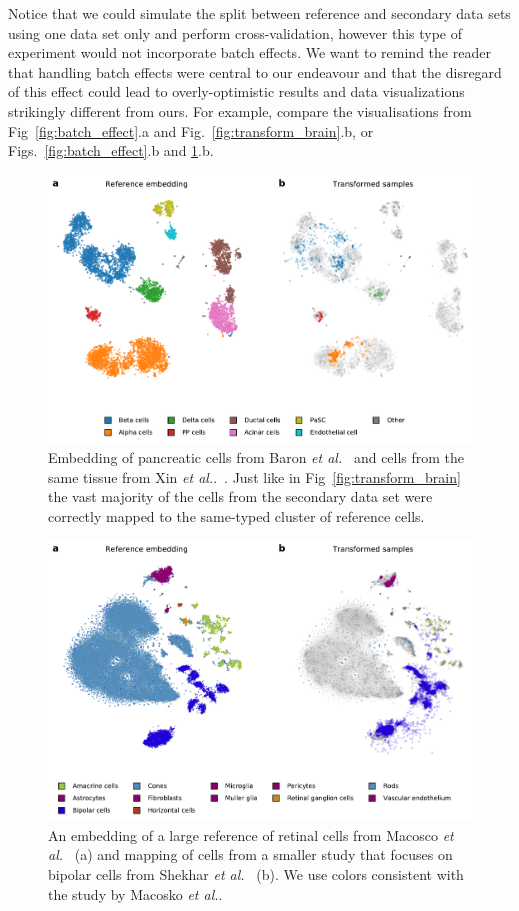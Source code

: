 \documentclass[runningheads]{llncs}
\newcommand{\etal}{\textit{et al.}}
\begin{document}
Notice that we could simulate the split between reference and secondary data
sets using one data set only and perform cross-validation, however this type of experiment
would not incorporate batch effects. We want to remind the reader that handling
batch effects were central to our endeavour and that the disregard of this effect
could lead to overly-optimistic results and data visualizations strikingly different from ours. For example,
compare the visualisations from Fig~\ref{fig:batch_effect}.a and
Fig.~\ref{fig:transform_brain}.b, or Figs.~\ref{fig:batch_effect}.b and
\ref{fig:transform_pancreas}.b.

\begin{figure}[htb]
\includegraphics[width=\textwidth]{figures/transform_pancreas.pdf}
\caption{Embedding of pancreatic cells from Baron \etal~\cite{baron2016} and
cells from the same tissue from Xin \etal.~\cite{xin2016}. Just like in
Fig~\ref{fig:transform_brain} the vast majority of the cells from the secondary
data set were correctly mapped to the same-typed cluster of reference
cells.}\label{fig:transform_pancreas}
\end{figure}


\begin{figure}[htb]
\includegraphics[width=\textwidth]{figures/transform_retina.pdf}
\caption{An embedding of a large reference of retinal cells from Macosco
\etal~\cite{macosko2015} (a) and mapping of cells from a smaller study that
focuses on bipolar cells from Shekhar \etal~\cite{shekhar2016} (b). We use
colors consistent with the study by Macosko \etal.} \label{fig:transform_retina}
\end{figure}
\end{document}
